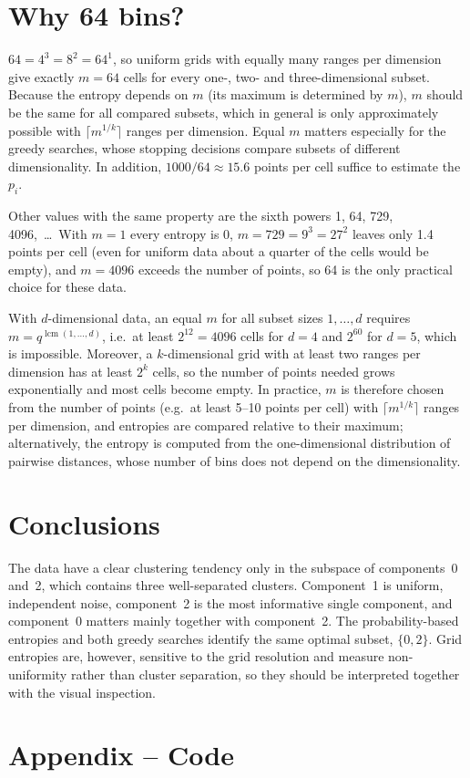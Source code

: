 \documentclass[a4paper,12pt]{article}
\begin{document}
\section{Why 64 bins?}

$64=4^3=8^2=64^1$, so uniform grids with equally many ranges per dimension
give exactly $m=64$ cells for every one-, two- and three-dimensional
subset. Because the entropy depends on $m$ (its maximum is determined by
$m$), $m$ should be the same for all compared subsets, which in general is
only approximately possible with $\lceil m^{1/k}\rceil$ ranges per
dimension. Equal $m$ matters especially for the greedy searches, whose
stopping decisions compare subsets of different dimensionality. In
addition, $1000/64\approx15.6$ points per cell suffice to estimate the
$p_i$.

Other values with the same property are the sixth powers 1, 64, 729,
4096,~\dots\ With $m=1$ every entropy is 0, $m=729=9^3=27^2$ leaves only
1.4 points per cell (even for uniform data about a quarter of the cells
would be empty), and $m=4096$ exceeds the number of points, so 64 is the
only practical choice for these data.

With $d$-dimensional data, an equal $m$ for all subset sizes $1,\dots,d$
requires $m=q^{\operatorname{lcm}(1,\dots,d)}$, i.e.\ at least $2^{12}=4096$
cells for $d=4$ and $2^{60}$ for $d=5$, which is impossible. Moreover, a
$k$-dimensional grid with at least two ranges per dimension has at least
$2^k$ cells, so the number of points needed grows exponentially and most
cells become empty. In practice, $m$ is therefore chosen from the number of
points (e.g.\ at least 5--10 points per cell) with $\lceil m^{1/k}\rceil$
ranges per dimension, and entropies are compared relative to their
maximum; alternatively, the entropy is computed from the one-dimensional
distribution of pairwise distances, whose number of bins does not depend
on the dimensionality.

\section{Conclusions}

The data have a clear clustering tendency only in the subspace of
components~0 and~2, which contains three well-separated clusters.
Component~1 is uniform, independent noise, component~2 is the most
informative single component, and component~0 matters mainly together with
component~2. The probability-based entropies and both greedy searches
identify the same optimal subset, $\{0,2\}$. Grid entropies are, however,
sensitive to the grid resolution and measure non-uniformity rather than
cluster separation, so they should be interpreted together with the visual
inspection.

\section{Appendix -- Code}


\end{document}
